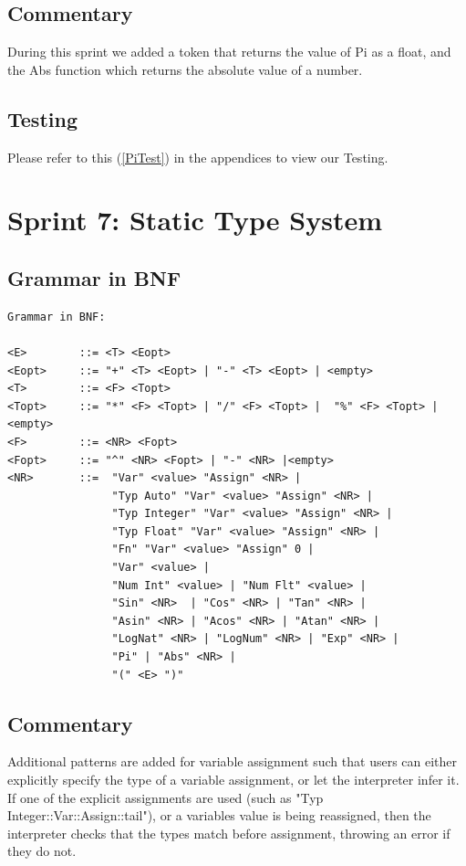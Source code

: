 \documentclass[a4paper, oneside, 11pt]{report}
\begin{document}
\subsection{Commentary}
During this sprint we added a token that returns the value of Pi as a float, and the Abs function which returns the absolute value of a number.


\subsection{Testing}
Please refer to this (\ref{PiTest}) in the appendices to view our Testing. \\


\clearpage
\section{Sprint 7: Static Type System}
\subsection{Grammar in BNF}
\begin{verbatim}
Grammar in BNF:

<E>        ::= <T> <Eopt>
<Eopt>     ::= "+" <T> <Eopt> | "-" <T> <Eopt> | <empty>
<T>        ::= <F> <Topt>
<Topt>     ::= "*" <F> <Topt> | "/" <F> <Topt> |  "%" <F> <Topt> |<empty>
<F>        ::= <NR> <Fopt>
<Fopt>     ::= "^" <NR> <Fopt> | "-" <NR> |<empty> 
<NR>       ::=  "Var" <value> "Assign" <NR> |
                "Typ Auto" "Var" <value> "Assign" <NR> |
                "Typ Integer" "Var" <value> "Assign" <NR> |
                "Typ Float" "Var" <value> "Assign" <NR> |
                "Fn" "Var" <value> "Assign" 0 |
                "Var" <value> |
                "Num Int" <value> | "Num Flt" <value> |
                "Sin" <NR>  | "Cos" <NR> | "Tan" <NR> |
                "Asin" <NR> | "Acos" <NR> | "Atan" <NR> |
                "LogNat" <NR> | "LogNum" <NR> | "Exp" <NR> |
                "Pi" | "Abs" <NR> |
                "(" <E> ")"
\end{verbatim}
\subsection{Commentary}
Additional patterns are added for variable assignment such that users can either explicitly specify the type of a variable assignment, or let the interpreter infer it. If one of the explicit assignments are used (such as "Typ Integer::Var::Assign::tail"), or a variables value is being reassigned, then the interpreter checks that the types match before assignment, throwing an error if they do not.
\end{document}
